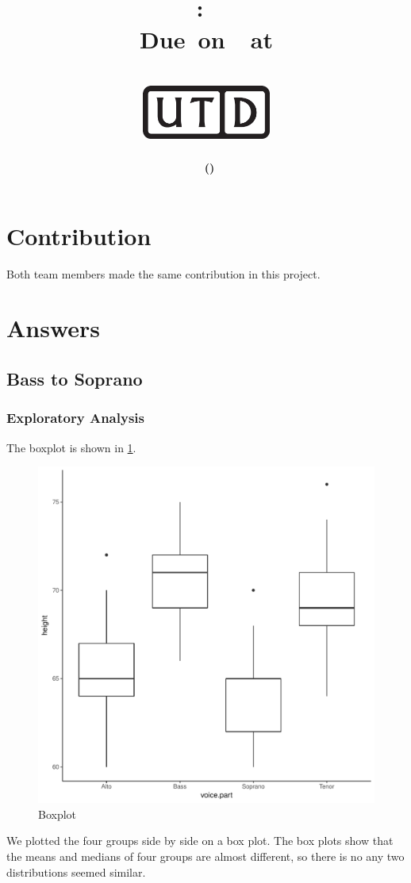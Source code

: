 \documentclass[11pt,letterpaper,titlepage,en-US]{article}
\title{
    \vspace{1in}
    \textmd{\textbf{\hmwkClassName \\\hmwkClass:\ \hmwkTitle }}\\
    \normalsize\vspace{0.1in}\small{Due\ on\ \DTMusedate{DueDate}\ at \DTMusetime{DueDate} }\\
    \vspace{0.1in}\large{\textit{\hmwkClassInstructor}}\\
    \vspace{0.5in}\includegraphics[height=2.4em]{UTD_logo_BW}\\
    \vspace{2in}
}
\author{\textbf{\hmwkAuthorName\ \footnotesize{(\hmwkAuthorNetID)}} \\ }
\date{}
\begin{document}
\maketitle

\tableofcontents
\pagebreak
{}

\section*{Contribution}
Both team members made the same contribution in this project.

\section{Answers}
\subsection{Bass to Soprano}
\subsubsection{Exploratory Analysis}

The boxplot is shown in \cref{bx}.

\begin{figure}[!htb]
\caption{Boxplot}\label{bx}
\centering
\includegraphics[width = .6\textwidth]{boxplot.pdf}
\end{figure}

We plotted the four groups side by side on a box plot. The box plots show that the means and medians of four groups are almost different, so there is no any two distributions seemed similar.
\end{document}
